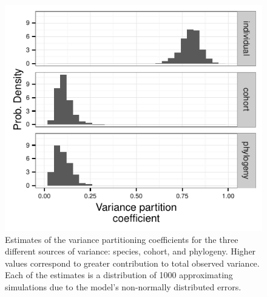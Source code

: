 \documentclass[12pt]{article}
\begin{document}
\begin{figure}[ht]
  \centering
  \includegraphics[height = 0.5\textheight, width = \textwidth, keepaspectratio = true]{figure/variance_est}
  \caption{Estimates of the variance partitioning coefficients for the three different sources of variance: species, cohort, and phylogeny. Higher values correspond to greater contribution to total observed variance. Each of the estimates is a distribution of 1000 approximating simulations due to the model's non-normally distributed errors.}
  \label{fig:vpc}
\end{figure}
\end{document}
